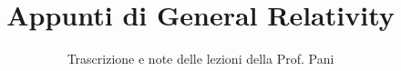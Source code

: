 \documentclass[a4paper,12pt]{article}
\title{Appunti di General Relativity}
\author{Trascrizione e note delle lezioni della Prof. Pani}
\date{}
\begin{document}
\maketitle
\projectintro
\tableofcontents
\newpage

\end{document}
